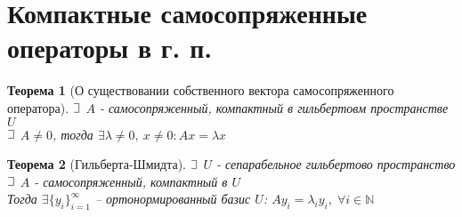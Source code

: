 \documentclass{article}
\theoremstyle{truestyle}
\newtheorem*{theorem}{Теорема}
\def\letus{%
	\mathord{\setbox0=\hbox{$\exists$}%
		\hbox{\kern 0.125\wd0%
			\vbox to \ht0{%
				\hrule width 0.75\wd0%
				\vfill%
				\hrule width 0.75\wd0}%
			\vrule height \ht0%
			\kern 0.125\wd0}%
	}%
}
\begin{document}
\section*{Компактные самосопряженные операторы в г. п.}
\begin{theorem}[О существовании собственного вектора самосопряженного оператора]
  $\letus$ $A$ - самосопряженный, компактный в гильбертовм пространстве $U$\\
  $\letus$ $A \not = 0$, тогда $\exists \lambda \not = 0, \ x \not = 0: Ax = \lambda x$
\end{theorem}

\begin{theorem}[Гильберта-Шмидта]
  $\letus$ $U$ - сепарабельное гильбертово пространство\\
  $\letus$ $A$ - самосопряженный, компактный в $U$\\
  Тогда $\exists \{y_i\}_{i=1}^{\infty}$ -- ортонормированный базис $U$: $Ay_i = \lambda_i y_i, \; \forall i \in \mathbb{N}$
\end{theorem}
\end{document}
